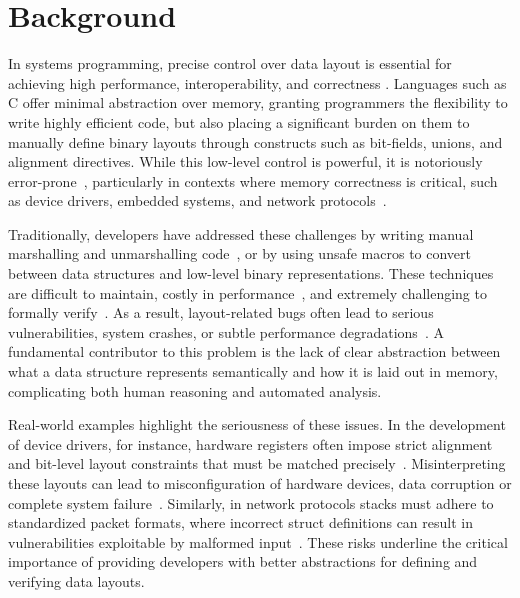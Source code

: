 \documentclass[12pt]{article}
\begin{document}
\section{Background} 
In systems programming, precise control over data layout is essential
for achieving high performance, interoperability, and correctness
\autocite{adt_layout_faria}. Languages such as C offer minimal 
abstraction over memory, granting programmers the flexibility to write highly efficient code, but also
placing a significant burden on them to manually define binary layouts through
constructs such as bit-fields, unions, and alignment directives. 
While this low-level control is powerful, it is
notoriously error-prone~\autocite{C_errors_study,memory_errors_stridharan}, particularly in contexts where memory correctness is critical, 
such as device drivers, embedded systems, and network protocols~\autocite{memory_bottleneck}.

Traditionally, developers have addressed these challenges by writing manual marshalling and 
unmarshalling code~\autocite{marshalling_performance}, or by using
unsafe macros to convert between data structures and low-level binary representations. 
These techniques are difficult to maintain, costly in 
performance~\autocite{memory_bottleneck}, and extremely challenging
to formally verify~\autocite{memory_formal_verification}. As a result, layout-related bugs often lead to serious vulnerabilities,
system crashes, or subtle performance degradations~\autocite{memory_errors_stridharan}. A fundamental contributor to this problem
is the lack of clear abstraction between what a data structure represents semantically and how 
it is laid out in memory, complicating both human reasoning and automated analysis.

Real-world examples highlight the seriousness of these issues. In the development
of device drivers, for instance, hardware registers often impose strict alignment
and bit-level layout constraints that must be matched precisely~\autocite{C_embedded_programming}. Misinterpreting
these layouts can lead to misconfiguration of hardware devices, data corruption
or complete system failure~\autocite{memory_errors_stridharan}. Similarly, in network protocols stacks must
adhere to standardized packet formats, where incorrect struct definitions can result
in vulnerabilities exploitable by malformed input~\autocite{network_memory_layouts}. These risks underline the critical
importance of providing developers with better abstractions for defining and verifying
data layouts. 
\end{document}
